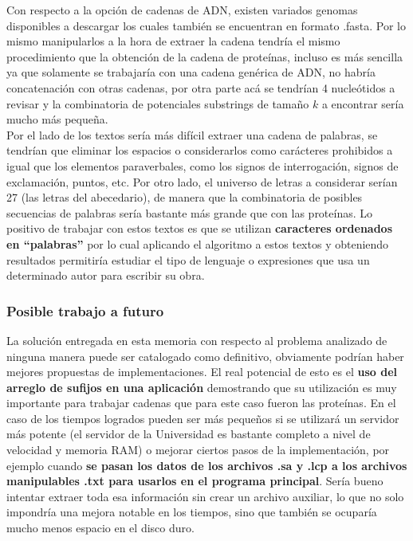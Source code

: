 Con respecto a la opción de cadenas de ADN, existen variados genomas disponibles a descargar los cuales también se encuentran en formato .fasta. Por lo mismo manipularlos a la hora de extraer la cadena tendría el mismo procedimiento que la obtención de la cadena de proteínas, incluso es más sencilla ya que solamente se trabajaría con una cadena genérica de ADN, no habría concatenación con otras cadenas, por otra parte acá se tendrían 4 nucleótidos a revisar y la combinatoria de potenciales substrings de tamaño $k$ a encontrar sería mucho más pequeña.\\
Por el lado de los textos sería más difícil extraer una cadena de palabras, se tendrían que eliminar los espacios o considerarlos como carácteres prohibidos a igual que los elementos paraverbales, como los signos de interrogación, signos de exclamación, puntos, etc. Por otro lado, el universo de letras a considerar serían 27 (las letras del abecedario), de manera que la combinatoria de posibles secuencias de palabras sería bastante más grande que con las proteínas. Lo positivo de trabajar con estos textos es que se utilizan \textbf{caracteres ordenados en ``palabras''} por lo cual aplicando el algoritmo a estos textos y obteniendo resultados permitiría estudiar el tipo de lenguaje o expresiones que usa un determinado autor para escribir su obra.

\subsubsection{Posible trabajo a futuro}

La solución entregada en esta memoria con respecto al problema analizado de ninguna manera puede ser catalogado como definitivo, obviamente podrían haber mejores propuestas de implementaciones. El real potencial de esto es el \textbf{uso del arreglo de sufijos en una aplicación} demostrando que su utilización es muy importante para trabajar cadenas que para este caso fueron las proteínas. En el caso de los tiempos logrados pueden ser más pequeños si se utilizará un servidor más potente (el servidor de la Universidad es bastante completo a nivel de velocidad y memoria RAM) o mejorar ciertos pasos de la implementación, por ejemplo cuando \textbf{se pasan los datos de los archivos .sa y .lcp a los archivos manipulables .txt para usarlos en el programa principal}. Sería bueno intentar extraer toda esa información sin crear un archivo auxiliar, lo que no solo impondría una mejora notable en los tiempos, sino que también se ocuparía mucho menos espacio en el disco duro.

